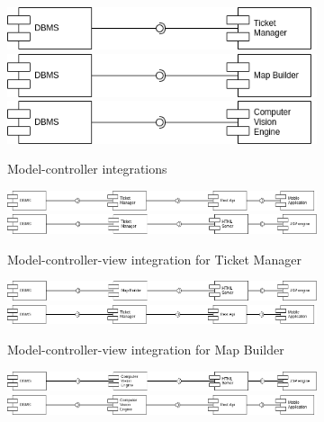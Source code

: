 \documentclass{article}
\begin{document}
	\begin{figure}[h]
		\caption{Basic Logic Integration}
		\label{fig:integrationBasicLogic}
		\begin{subfigure}[H]{\linewidth}
			\includegraphics[width=.33\linewidth]{images/Integration_basicLogic_1.png}
			\includegraphics[width=.33\linewidth]{images/Integration_basicLogic_5.png}
			\includegraphics[width=.33\linewidth]{images/Integration_basicLogic_9.png}	
			\caption{Model-controller integrations}
		\end{subfigure}
		\begin{subfigure}[H]{\linewidth}
			\includegraphics[width=\textwidth]{images/Integration_basicLogic_2.png}
			\includegraphics[width=\textwidth]{images/Integration_basicLogic_3.png}
			\caption{Model-controller-view integration for Ticket Manager}
		\end{subfigure}
		\begin{subfigure}[H]{\linewidth}
			\includegraphics[width=\linewidth]{images/Integration_basicLogic_6.png}
			\includegraphics[width=\linewidth]{images/Integration_basicLogic_7.png}
			\caption{Model-controller-view integration for Map Builder}
		\end{subfigure}
		\begin{subfigure}[H]{\linewidth}
			\includegraphics[width=\linewidth]{images/Integration_basicLogic_10.png}
			\includegraphics[width=\linewidth]{images/Integration_basicLogic_11.png}

\end{subfigure}
\end{figure}
\end{document}
